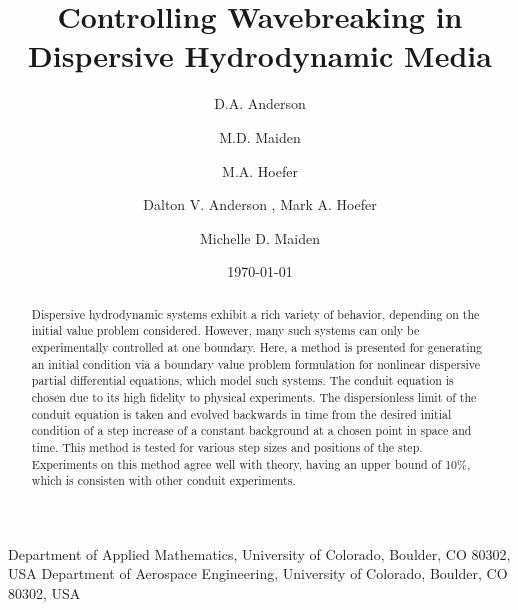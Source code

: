 \documentclass{jfm}
\title{Controlling Wavebreaking in Dispersive Hydrodynamic Media}
\author{D.A. Anderson}
\author{M.D. Maiden}
\author{M.A. Hoefer}
\affiliation{Department of Applied Mathematics, University of Colorado, Boulder, Colorado 80309, USA}
\date{\today}
\begin{document}

\author
 {
 Dalton V. Anderson
  ,
  Mark A. Hoefer 
  \and
  Michelle D. Maiden
  }

\affiliation
{
Department of Applied Mathematics, University of Colorado, Boulder, CO 80302, USA
Department of Aerospace Engineering, University of Colorado, Boulder, CO 80302, USA
}

\maketitle

\begin{abstract}
Dispersive hydrodynamic systems exhibit a rich variety of behavior, depending on the initial value problem considered. However, many such systems can only be experimentally controlled at one boundary. Here, a method is presented for generating an initial condition via a boundary value problem formulation for nonlinear dispersive partial differential equations, which model such systems. The conduit equation is chosen due to its high fidelity to physical experiments. The dispersionless limit of the conduit equation is taken and evolved backwards in time from the desired initial condition of a step increase of a constant background at a chosen point in space and time. This method is tested for various step sizes and positions of the step. Experiments on this method agree well with theory, having an upper bound of 10\%, which is consisten with other conduit experiments.
\end{abstract}
\end{document}
